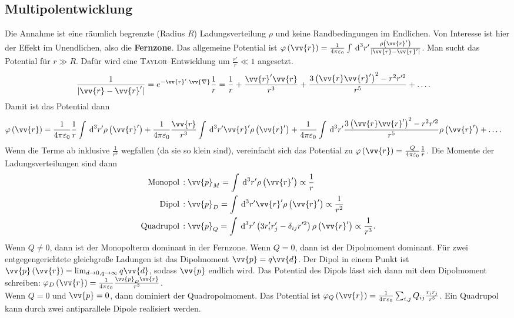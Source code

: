 \documentclass[a4paper,12pt]{article}
\newcommand{\td}{\,\text{d}}
\numberwithin{equation}{section}
\begin{document}
\subsection{Multipolentwicklung}
Die Annahme ist eine räumlich begrenzte (Radius $R$) Ladungsverteilung $\rho $ und keine Randbedingungen im Endlichen. Von Interesse ist hier der Effekt im Unendlichen, also die \textbf{Fernzone}. Das allgemeine Potential ist $\varphi \left(\vv{r}\right)=\tfrac{1}{4\pi \varepsilon _0}\int_{}^{}\td ^3r'\tfrac{\rho \left(\vv{r}'\right)}{|\vv{r}-\vv{r}'|}$. Man sucht das Potential für $r\gg R$. Dafür wird eine \textsc{Taylor}--Entwicklung um $\tfrac{r'}{r}\ll 1$ angesetzt.
\begin{align} 
        \dfrac{1}{|\vv{r}-\vv{r}'|}&=e^{-\vv{r}'\cdot \vv{\nabla }}\dfrac{1}{r}=\dfrac{1}{r}+\dfrac{\vv{r}'\vv{r}}{r^3}+\dfrac{3\left(\vv{r}\vv{r}'\right)^2-r^2r'^2}{r^5}+\hdots 
.\end{align} 
Damit ist das Potential dann
\begin{align} 
        \varphi \left(\vv{r}\right)&=\dfrac{1}{4\pi \varepsilon _0}\dfrac{1}{r}\int_{}^{}\td ^3r'\rho \left(\vv{r}'\right)+\dfrac{1}{4\pi \varepsilon _0}\dfrac{\vv{r}}{r^3}\int_{}^{}\td ^3r'\vv{r}'\rho \left(\vv{r}'\right)+\dfrac{1}{4\pi \varepsilon _0}\int_{}^{}\td ^3r'\dfrac{3\left(\vv{r}\vv{r}'\right)^2-r^2r'^2}{r^5}\rho \left(\vv{r}'\right)+\hdots 
.\end{align}
Wenn die Terme ab inklusive $\tfrac{1}{r^3}$ wegfallen (da sie so klein sind), vereinfacht sich das Potential zu $\varphi \left(\vv{r}\right)=\tfrac{Q}{4\pi \varepsilon _0}\tfrac{1}{r}$. Die Momente der Ladungsverteilungen sind dann
\begin{align} 
        \,\text{Monopol}\,&:\vv{p}_M=\int_{}^{}\td ^3r'\rho \left(\vv{r}'\right)\propto \dfrac{1}{r}\\
        \,\text{Dipol}\,&:\vv{p}_D=\int_{}^{}\td ^3r'\vv{r}'\rho \left(\vv{r}'\right)\propto \dfrac{1}{r^2}\\
        \,\text{Quadrupol}\,&:\vv{p}_Q=\int_{}^{}\td ^3r'\left(3r_i'r_j'-\delta _{ij}r'^2\right)\rho \left(\vv{r}'\right)\propto \dfrac{1}{r^3}
.\end{align} 
Wenn $Q\neq 0$, dann ist der Monopolterm dominant in der Fernzone. Wenn $Q=0$, dann ist der Dipolmoment dominant. Für zwei entgegengerichtete gleichgroße Ladungen ist das Dipolmoment $\vv{p}=q\vv{d}$. Der Dipol in einem Punkt ist $\vv{p}\left(\vv{r}\right)=\lim_{d\rightarrow 0,q\rightarrow \infty}q\vv{d}$, sodass $\vv{p}$ endlich wird.
Das Potential des Dipols lässt sich dann mit dem Dipolmoment schreiben: $\varphi _D\left(\vv{r}\right)=\tfrac{1}{4\pi \varepsilon _0}\tfrac{\vv{p}_D\vv{r}}{r^3}$.\\\indent
Wenn $Q=0$ und $\vv{p}=0$, dann dominiert der Quadropolmoment. Das Potential ist $\varphi _Q\left(\vv{r}\right)=\tfrac{1}{4\pi \varepsilon _0}\sum_{i,j}^{}Q_{ij}\tfrac{r_ir_j}{r^5}$. Ein Quadrupol kann durch zwei antiparallele Dipole realisiert werden.
\end{document}

